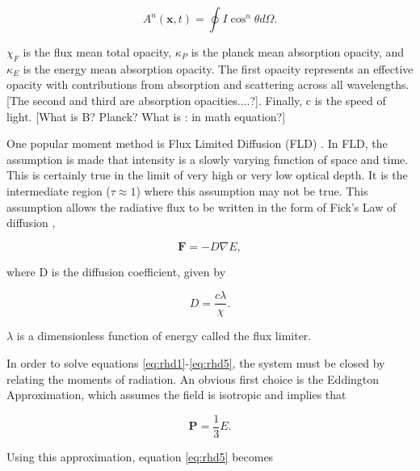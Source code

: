 \begin{equation}
A^n(\mathbf{x},t) = \oint I \cos^{n}{\theta}d\Omega.
\end{equation}

$\chi_F$ is the flux mean total opacity, $\kappa_P$ is the planck mean absorption opacity, and $\kappa_E$ is the energy mean absorption opacity. The first opacity represents an effective opacity with contributions from absorption and scattering across all wavelengths. [The second and third are absorption opacities....?]. Finally, c is the speed of light. [What is B? Planck? What is : in math equation?]


One popular moment method is Flux Limited Diffusion (FLD) \citep{almeWilson74,levermorePomraning81,pomraning83,meliaZylstra91,anileRomano92}. In FLD, the assumption is made that intensity is a slowly varying function of space and time. This is certainly true in the limit of very high or very low optical depth. It is the intermediate region ($\tau \approx 1$) where this assumption may not be true. This assumption allows the radiative flux to be written in the form of Fick's Law of diffusion \citep{levermorePomraning81},

\begin{equation}
\label{eq:fluxfdiffusion}
\mathbf{F} = -D\nabla E,
\end{equation}

where D is the diffusion coefficient, given by

\begin{equation}
\label{eq:diffusioncoeff}
D = \frac{c\lambda}{\chi}.
\end{equation}

$\lambda$ is a dimensionless function of energy called the flux limiter.

In order to solve equations \ref{eq:rhd1}-\ref{eq:rhd5}, the system must be closed by relating the moments of radiation. An obvious first choice is the Eddington Approximation, which assumes the field is isotropic and implies that

\begin{equation}
\label{eq:eddingtonapprox}
\mathbf{P} = \frac{1}{3}E.
\end{equation}

Using this approximation, equation \ref{eq:rhd5} becomes

